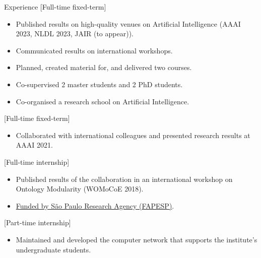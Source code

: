 %

\begin{rSection}{Experience}
    [Full-time fixed-term]{%
        \begin{itemize}
            \item Published results on high-quality venues on Artificial Intelligence (AAAI 2023, NLDL 2023, JAIR (to appear)).
            \item Communicated results on international workshops.
            \item Planned, created material for, and delivered two courses.
            \item Co-supervised 2 master students and 2 PhD students.
            \item Co-organised a research school on Artificial Intelligence.
        \end{itemize}%
    }

    [Full-time fixed-term]{%
        \begin{itemize}
            \item Collaborated with international colleagues and presented research results at AAAI 2021.
        \end{itemize}%
    }

    [Full-time internship]{%
        \begin{itemize}
            \item Published results of the collaboration in an international workshop on Ontology Modularity (WOMoCoE 2018).
            \item \href{https://bv.fapesp.br/en/bolsas/176114/improving-efficiency-of-belief-base-change-in-description-logics-with-modularity-in-ontologies/}{Funded by São Paulo Research Agency ({FAPESP})}.
        \end{itemize}%
    }

    [Part-time internship]{%
        \begin{itemize}
            \item Maintained and developed the computer network that supports the institute's undergraduate students.
        \end{itemize}%
    }
\end{rSection}
